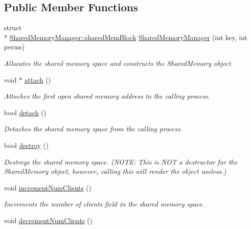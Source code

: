 \subsection*{Public Member Functions}
\begin{DoxyCompactItemize}
\item 
struct \\*
\hyperlink{structSharedMemoryManager_1_1sharedMemBlock}{Shared\-Memory\-Manager\-::shared\-Mem\-Block} \hyperlink{classSharedMemoryManager_a30d8438be6747a19fc23450514445cab}{Shared\-Memory\-Manager} (int key, int perms)
\begin{DoxyCompactList}\small\item\em Allocates the shared memory space and constructs the Shared\-Memory object. \end{DoxyCompactList}\item 
void $\ast$ \hyperlink{classSharedMemoryManager_a4118ad7e39bcb21bc858cd4b307a830e}{attach} ()
\begin{DoxyCompactList}\small\item\em Attaches the first open shared memory address to the calling process. \end{DoxyCompactList}\item 
bool \hyperlink{classSharedMemoryManager_a5c8eb92892c13e1e3007d236d538c8e7}{detach} ()
\begin{DoxyCompactList}\small\item\em Detaches the shared memory space from the calling process. \end{DoxyCompactList}\item 
bool \hyperlink{classSharedMemoryManager_a95d1f28eb377b4988dcf1724dcffe946}{destroy} ()
\begin{DoxyCompactList}\small\item\em Destroys the shared memory space. (N\-O\-T\-E\-: This is N\-O\-T a destructor for the Shared\-Memory object, however, calling this will render the object useless.) \end{DoxyCompactList}\item 
\hypertarget{classSharedMemoryManager_aed3b566162518064ccca17fa071e64b9}{void \hyperlink{classSharedMemoryManager_aed3b566162518064ccca17fa071e64b9}{increment\-Num\-Clients} ()}\label{classSharedMemoryManager_aed3b566162518064ccca17fa071e64b9}

\begin{DoxyCompactList}\small\item\em Increments the number of clients field in the shared memory space. \end{DoxyCompactList}\item 
\hypertarget{classSharedMemoryManager_a106346050cf61a7f270f078632d510f4}{void \hyperlink{classSharedMemoryManager_a106346050cf61a7f270f078632d510f4}{decrement\-Num\-Clients} ()}\label{classSharedMemoryManager_a106346050cf61a7f270f078632d510f4}


\end{DoxyCompactItemize}
